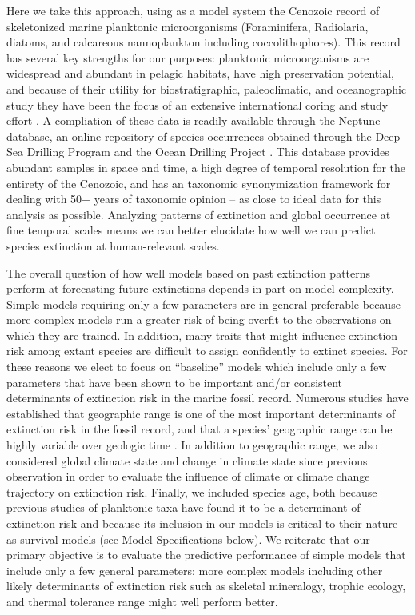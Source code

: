 \documentclass[12pt,letterpaper]{article}
\begin{document}
\begin{refsection}
Here we take this approach, using as a model system the Cenozoic record of skeletonized marine planktonic microorganisms (Foraminifera, Radiolaria, diatoms, and calcareous nannoplankton including coccolithophores). This record has several key strengths for our purposes: planktonic microorganisms are widespread and abundant in pelagic habitats, have high preservation potential, and because of their utility for biostratigraphic, paleoclimatic, and oceanographic study they have been the focus of an extensive international coring and study effort \citep{Lazarus1994,SpencerCervato1999}. A compliation of these data is readily available through the Neptune database, an online repository of species occurrences obtained through the Deep Sea Drilling Program and the Ocean Drilling Project \citep{Lazarus1994,SpencerCervato1999}. This database provides abundant samples in space and time, a high degree of temporal resolution for the entirety of the Cenozoic, and has an taxonomic synonymization framework for dealing with 50+ years of taxonomic opinion \citep{Lazarus1994} -- as close to ideal data for this analysis as possible. Analyzing patterns of extinction and global occurrence at fine temporal scales means we can better elucidate how well we can predict species extinction at human-relevant scales.


The overall question of how well models based on past extinction patterns perform at forecasting future extinctions depends in part on model complexity. Simple models requiring only a few parameters are in general preferable because more complex models run a greater risk of being overfit to the observations on which they are trained. In addition, many traits that might influence extinction risk among extant species are difficult to assign confidently to extinct species. For these reasons we elect to focus on “baseline” models which include only a few parameters that have been shown to be important and/or consistent determinants of extinction risk in the marine fossil record. Numerous studies have established that geographic range is one of the most important determinants of extinction risk in the fossil record, and that a species’ geographic range can be highly variable over geologic time \citep{Foote2007,Liow2010,Liow2007,Kiessling2013,Payne2007,Jablonski2003,Jablonski2008,Jablonski2006}. In addition to geographic range, we also considered global climate state and change in climate state since previous observation in order to evaluate the influence of climate or climate change trajectory on extinction risk. Finally, we included species age, both because previous studies of planktonic taxa have found it to be a determinant of extinction risk and because its inclusion in our models is critical to their nature as survival models (see Model Specifications below). We reiterate that our primary objective is to evaluate the predictive performance of simple models that include only a few general parameters; more complex models including other likely determinants of extinction risk such as skeletal mineralogy, trophic ecology, and thermal tolerance range might well perform better.




\end{refsection}
\end{document}
